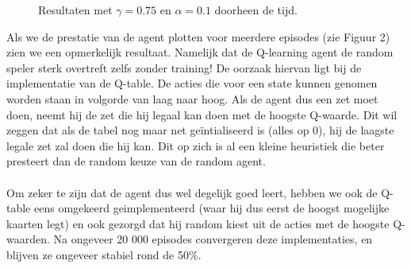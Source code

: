\documentclass[11pt]{article}
\begin{document}
\begin{figure}[H]
    \centering
    \qquad
    \caption{Resultaten met $\gamma = 0.75$ en $\alpha = 0.1$ doorheen de tijd.}
    \label{fig:example}
\end{figure}
Als we de prestatie van de agent plotten voor meerdere episodes (zie Figuur 2) zien we een opmerkelijk resultaat. Namelijk dat de Q-learning agent de random speler sterk overtreft zelfs zonder training! De oorzaak hiervan ligt bij de implementatie van de Q-table. De acties die voor een state kunnen genomen worden staan in volgorde van laag naar hoog. Als de agent dus een zet moet doen, neemt hij de zet die hij legaal kan doen met de hoogste Q-waarde. Dit wil zeggen dat als de tabel nog maar net geïntialiseerd is (alles op 0), hij de laagste legale zet zal doen die hij kan. Dit op zich is al een kleine heuristiek die beter presteert dan de random keuze van de random agent.\\\\
Om zeker te zijn dat de agent dus wel degelijk goed leert, hebben we ook de Q-table eens omgekeerd geimplementeerd (waar hij dus eerst de hoogst mogelijke kaarten legt) en ook gezorgd dat hij random kiest uit de acties met de hoogste Q-waarden. Na ongeveer 20 000 episodes convergeren deze implementaties, en blijven ze ongeveer stabiel rond de 50\%.
\end{document}
